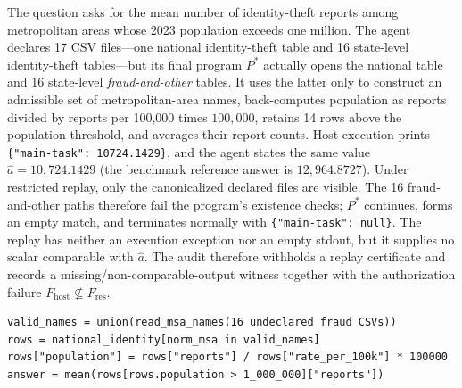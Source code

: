 The question asks for the mean number of identity-theft reports among
metropolitan areas whose 2023 population exceeds one million.  The agent
declares 17 CSV files---one national identity-theft table and 16 state-level
identity-theft tables---but its final program $P^*$ actually opens the
national table and 16 state-level \emph{fraud-and-other} tables.  It uses the
latter only to construct an admissible set of metropolitan-area names,
back-computes population as reports divided by reports per 100,000 times
$100{,}000$, retains 14 rows above the population threshold, and averages
their report counts.  Host execution prints
\texttt{\{"main-task": 10724.1429\}}, and the agent states the same value
$\hat a=10{,}724.1429$ (the benchmark reference answer is $12{,}964.8727$).
Under restricted replay, only the canonicalized declared files are visible.
The 16 fraud-and-other paths therefore fail the program's existence checks;
$P^*$ continues, forms an empty match, and terminates normally with
\texttt{\{"main-task": null\}}.  The replay has neither an execution
exception nor an empty stdout, but it supplies no scalar comparable with
$\hat a$.  The audit therefore withholds a replay certificate and records a
missing/non-comparable-output witness together with the authorization failure
$F_{\mathrm{host}}\nsubseteq F_{\mathrm{res}}$.

\begin{verbatim}
valid_names = union(read_msa_names(16 undeclared fraud CSVs))
rows = national_identity[norm_msa in valid_names]
rows["population"] = rows["reports"] / rows["rate_per_100k"] * 100000
answer = mean(rows[rows.population > 1_000_000]["reports"])
\end{verbatim}
